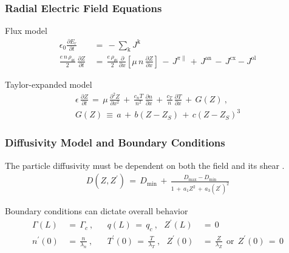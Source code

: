 \documentclass[10pt]{beamer}
\begin{document}
\begin{frame} %
\frametitle{Radial Electric Field Equations}

Flux model
\begin{align} %
	\epsilon_0 \frac{\partial E_r}{\partial t} \,&=\, -\sum_\text{k} J^\text{k} \\
	\frac{e \, n \, \rho_{\theta i}}{2} \, \frac{\partial Z}{\partial t}
		\,&=\, \frac{e \, \rho_{\theta i}}{2} \frac{\partial}{\partial x}
		\left[\mu \, n \, \frac{\partial Z}{\partial x}\right] \,-\,
		J^{\pi\parallel} \,+\, J^\text{an} \,-\, J^\text{cx} - J^\text{ol}
		\label{eq:normalized_Z_equation}
\end{align}

Taylor-expanded model \parencite{zohm_dynamic_1994}
\begin{align} %
	\epsilon \, \frac{\partial Z}{\partial t} \,=\, \mu \,
		\frac{\partial^2 Z}{\partial x^2} \,+\, \frac{c_n T}{n^2} \,
		\frac{\partial n}{\partial x} \,+\, \frac{c_T}{n} \,
		\frac{\partial T}{\partial x} \,+\, G(Z)~,\label{eq:original_Z_equation} \\
	G(Z) \,\equiv\, a \,+\, b(Z - Z_S) \,+\, c(Z - Z_S)^3
		\label{eq:G_polynomial}
\end{align}

\end{frame}


\begin{frame} %
\frametitle{Diffusivity Model and Boundary Conditions}

The particle diffusivity must be dependent on both the field and its shear \parencite{paquay_studying_2012}.
\begin{align} %
	D(Z, Z^{\prime}) \,=\, D_\text{min} \,+\,
		\frac{D_\text{max} - D_\text{min}}{1 \,+\, a_1 Z^2 \,+\,
		a_3 (Z^{\prime})^2} \label{eq:flow_shear_diffusivity}
\end{align}

Boundary conditions can dictate overall behavior
\begin{align} %
	\Gamma(L) \,&=\, \Gamma_c~,~~~ &q(L) \,=\, q_c~,~~~ Z^\prime(L) \,&=\, 0 \\
	n^\prime(0) \,&=\, \frac{n}{\lambda_n}~, ~~~~ &T^\prime(0) \,=\,
	\frac{T}{\lambda_T}~,~~~ Z^\prime(0) \,&=\, \frac{Z}{\lambda_Z} ~~
		\text{or} ~~ Z^\prime(0) \,=\, 0
\end{align}

\end{frame}
\end{document}
